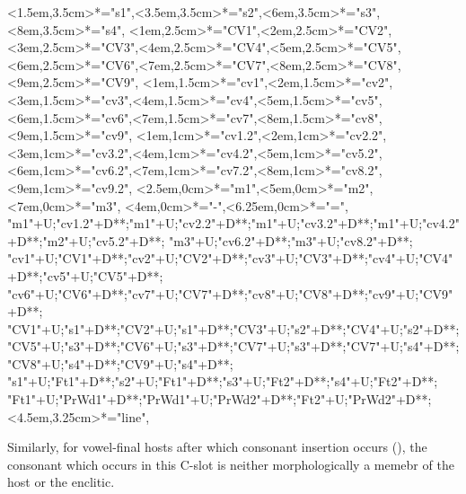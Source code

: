 \begin{multicols}{2}
\begin{exe}
{\begin{xlist}
{<1.5em,3.5cm>*="s1",<3.5em,3.5cm>*="s2",<6em,3.5cm>*="s3",<8em,3.5cm>*="s4",
		<1em,2.5cm>*="CV1",<2em,2.5cm>*="CV2",<3em,2.5cm>*="CV3",<4em,2.5cm>*="CV4",<5em,2.5cm>*="CV5",
		<6em,2.5cm>*="CV6",<7em,2.5cm>*="CV7",<8em,2.5cm>*="CV8",<9em,2.5cm>*="CV9",
		<1em,1.5cm>*="cv1",<2em,1.5cm>*="cv2",<3em,1.5cm>*="cv3",<4em,1.5cm>*="cv4",<5em,1.5cm>*="cv5",
		<6em,1.5cm>*="cv6",<7em,1.5cm>*\as{ }="cv7",<8em,1.5cm>*="cv8",<9em,1.5cm>*\as{ }="cv9",
		<1em,1cm>*="cv1.2",<2em,1cm>*="cv2.2",<3em,1cm>*="cv3.2",<4em,1cm>*="cv4.2",<5em,1cm>*="cv5.2",
		<6em,1cm>*="cv6.2",<7em,1cm>*\as{ }="cv7.2",<8em,1cm>*="cv8.2",<9em,1cm>*\as{ }="cv9.2",
		<2.5em,0cm>*="m1",<5em,0cm>*="m2",<7em,0cm>*="m3",
		<4em,0cm>*\as{-}="-",<6.25em,0cm>*\as{=}="=",
		"m1"+U;"cv1.2"+D**\dir{-};"m1"+U;"cv2.2"+D**\dir{-};"m1"+U;"cv3.2"+D**\dir{-};"m1"+U;"cv4.2"+D**\dir{-};"m2"+U;"cv5.2"+D**\dir{-};
		"m3"+U;"cv6.2"+D**\dir{-};"m3"+U;"cv8.2"+D**\dir{-};
		"cv1"+U;"CV1"+D**\dir{-};"cv2"+U;"CV2"+D**\dir{-};"cv3"+U;"CV3"+D**\dir{-};"cv4"+U;"CV4"+D**\dir{-};"cv5"+U;"CV5"+D**\dir{-};
		"cv6"+U;"CV6"+D**\dir{-};"cv7"+U;"CV7"+D**\dir{};"cv8"+U;"CV8"+D**\dir{-};"cv9"+U;"CV9"+D**\dir{};
		"CV1"+U;"s1"+D**\dir{-};"CV2"+U;"s1"+D**\dir{-};"CV3"+U;"s2"+D**\dir{-};"CV4"+U;"s2"+D**\dir{-};
		"CV5"+U;"s3"+D**\dir{-};"CV6"+U;"s3"+D**\dir{-};"CV7"+U;"s3"+D**\dir{-};"CV7"+U;"s4"+D**\dir{-};"CV8"+U;"s4"+D**\dir{-};"CV9"+U;"s4"+D**\dir{-};
		"s1"+U;"Ft1"+D**\dir{-};"s2"+U;"Ft1"+D**\dir{-};"s3"+U;"Ft2"+D**\dir{-};"s4"+U;"Ft2"+D**\dir{-};
		"Ft1"+U;"PrWd1"+D**\dir{-};"PrWd1"+U;"PrWd2"+D**\dir{-};"Ft2"+U;"PrWd2"+D**\dir{-};
		<4.5em,3.25cm>*="line",
	\endxy}\label{as:moin-t=ee}
	\end{xlist}}
\end{exe}
\end{multicols}

Similarly, for vowel-final hosts after which consonant insertion occurs (),
the consonant which occurs in this C-slot is neither morphologically a
memebr of the host or the enclitic.
